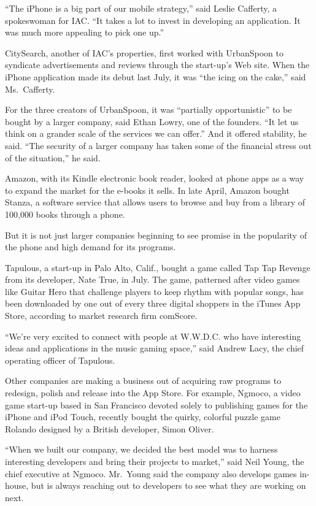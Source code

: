 \documentclass[12pt,a4paper,onecolumn]{article}
\begin{document}
``The iPhone is a big part of our mobile strategy,'' said Leslie Cafferty, a spokeswoman for IAC.
``It takes a lot to invest in developing an application. It was much more appealing to pick one
up.''

CitySearch, another of IAC's properties, first worked with UrbanSpoon to syndicate advertisements
and reviews through the start-up's Web site. When the iPhone application made its debut last July,
it was ``the icing on the cake,'' said Ms.~Cafferty.

For the three creators of UrbanSpoon, it was ``partially opportunistic'' to be bought by a larger
company, said Ethan Lowry, one of the founders. ``It let us think on a grander scale of the services
we can offer.'' And it offered stability, he said. ``The security of a larger company has taken some
of the financial stress out of the situation,'' he said.

Amazon, with its Kindle electronic book reader, looked at phone apps as a way to expand the market
for the e-books it sells. In late April, Amazon bought Stanza, a software service that allows users
to browse and buy from a library of 100,000 books through a phone.

But it is not just larger companies beginning to see promise in the popularity of the phone and high
demand for its programs.

Tapulous, a start-up in Palo Alto, Calif., bought a game called Tap Tap Revenge from its developer,
Nate True, in July. The game, patterned after video games like Guitar Hero that challenge players to
keep rhythm with popular songs, has been downloaded by one out of every three digital shoppers in
the iTunes App Store, according to market research firm comScore.

``We're very excited to connect with people at W.W.D.C. who have interesting ideas and applications
in the music gaming space,'' said Andrew Lacy, the chief operating officer of Tapulous.

Other companies are making a business out of acquiring raw programs to redesign, polish and release
into the App Store. For example, Ngmoco, a video game start-up based in San Francisco devoted solely
to publishing games for the iPhone and iPod Touch, recently bought the quirky, colorful puzzle game
Rolando designed by a British developer, Simon Oliver.

``When we built our company, we decided the best model was to harness interesting developers and
bring their projects to market,'' said Neil Young, the chief executive at Ngmoco. Mr.~Young said the
company also develops games in-house, but is always reaching out to developers to see what they are
working on next.
\end{document}
